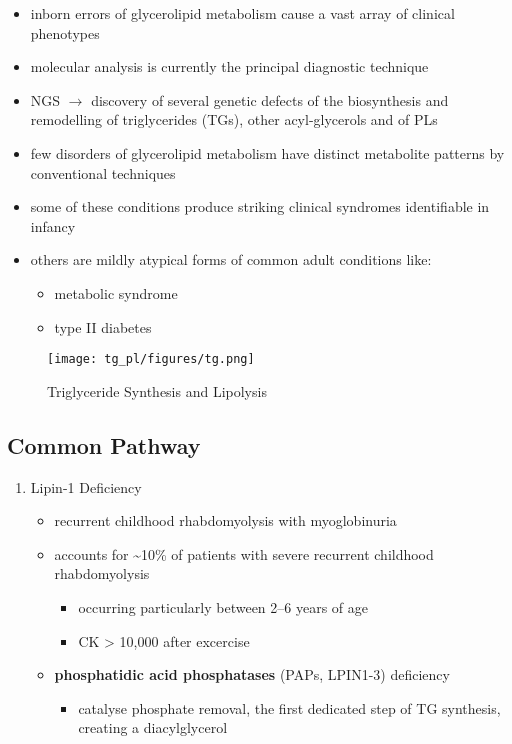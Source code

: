 \documentclass[12pt]{scrartcl}
\begin{document}
\begin{itemize}
\item inborn errors of glycerolipid metabolism cause a vast array of
clinical phenotypes
\item molecular analysis is currently the principal diagnostic
technique
\item NGS \(\to\) discovery of several genetic defects of the biosynthesis and
remodelling of triglycerides (TGs), other acyl-glycerols and of PLs
\item few disorders of glycerolipid metabolism have distinct metabolite
patterns by conventional techniques
\item some of these conditions produce striking clinical syndromes
identifiable in infancy
\item others are mildly atypical forms of common adult conditions like:
\begin{itemize}
\item metabolic syndrome
\item type II diabetes
\end{itemize}
\end{itemize}

\begin{figure}[htbp]
\centering
\texttt{[image: tg\_pl/figures/tg.png]}
\caption{\label{fig:orgdd00d03}Triglyceride Synthesis and Lipolysis}
\end{figure}

\subsection{Common Pathway}
\label{sec:org5f9420e}
\begin{enumerate}
\item Lipin-1 Deficiency
\label{sec:org0bd74d7}
\begin{itemize}
\item recurrent childhood rhabdomyolysis with myoglobinuria
\item accounts for \textasciitilde{}10\% of patients with severe recurrent childhood
rhabdomyolysis
\begin{itemize}
\item occurring particularly between 2–6 years of age
\item CK \textgreater{} 10,000 after excercise
\end{itemize}
\item \textbf{phosphatidic acid phosphatases} (PAPs, LPIN1-3) deficiency
\begin{itemize}
\item catalyse phosphate removal, the first dedicated step of TG
synthesis, creating a diacylglycerol
\end{itemize}
\end{itemize}
\end{enumerate}
\end{document}
